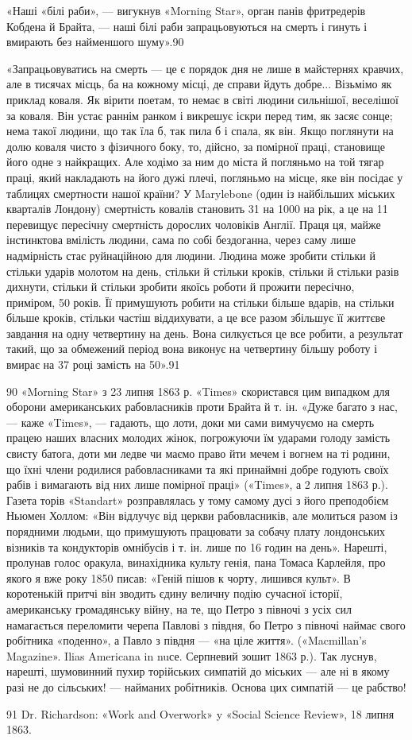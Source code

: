 «Наші «білі раби», — вигукнув «Morning Star», орган панів
фритредерів Кобдена й Брайта, — наші білі раби запрацьовуються
на смерть і гинуть і вмирають без найменшого шуму».90

«Запрацьовуватись на смерть — це є порядок дня не лише
в майстернях кравчих, але в тисячах місць, ба на кожному місці,
де справи йдуть добре... Візьмімо як приклад коваля. Як вірити
поетам, то немає в світі людини сильнішої, веселішої за коваля.
Він устає раннім ранком і викрешує іскри перед тим, як засяє
сонце; нема такої людини, що так їла б, так пила б і спала, як
він. Якщо поглянути на долю коваля чисто з фізичного боку, то,
дійсно, за помірної праці, становище його одне з найкращих.
Але ходімо за ним до міста й погляньмо на той тягар праці, який
накладають на його дужі плечі, погляньмо на місце, яке він посідає
у таблицях смертности нашої країни? У Marylebone (один із
найбільших міських кварталів Лондону) смертність ковалів становить
31 на 1000 на рік, а це на 11 перевищує пересічну смертність
дорослих чоловіків Англії. Праця ця, майже інстинктова вмілість
людини, сама по собі бездоганна, через саму лише надмірність
стає руйнаційною для людини. Людина може зробити стільки й
стільки ударів молотом на день, стільки й стільки кроків, стільки
й стільки разів дихнути, стільки й стільки зробити якоїсь роботи
й прожити пересічно, приміром, 50 років. Її примушують робити
на стільки більше вдарів, на стільки більше кроків, стільки частіш
віддихувати, а це все разом збільшує її життєве завдання на
одну четвертину на день. Вона силкується це все робити, а результат
такий, що за обмежений період вона виконує на четвертину
більшу роботу і вмирає на 37 році замість на 50».91

90 «Morning Star» з 23 липня 1863 р. «Times» скористався цим випадком
для оборони американських рабовласників проти Брайта й т. ін.
«Дуже багато з нас, — каже «Times», — гадають, що лоти, доки ми сами
вимучуємо на смерть працею наших власних молодих жінок, погрожуючи
їм ударами голоду замість свисту батога, доти ми ледве чи маємо право
йти мечем і вогнем на ті родини, що їхні члени родилися рабовласниками
та які принаймні добре годують своїх рабів і вимагають від них лише
помірної праці» («Times», а 2 липня 1863 р.). Газета торів «Standart»
розправлялась у тому самому дусі з його преподобієм Ньюмен Холлом:
«Він відлучує від церкви рабовласників, але молиться разом із порядними
людьми, що примушують працювати за собачу плату лондонських візників
та кондукторів омнібусів і т. ін. лише по 16 годин на день». Нарешті,
пролунав голос оракула, винахідника культу генія, пана Томаса Карлейля,
про якого я вже року 1850 писав: «Геній пішов к чорту, лишився культ».
В коротенькій притчі він зводить єдину величну подію сучасної історії,
американську громадянську війну, на те, що Петро з півночі з усіх сил
намагається переломити черепа Павлові з півдня, бо Петро з півночі
наймає свого робітника «поденно», а Павло з півдня — «на ціле життя».
(«Macmillan’s Magazine». Ilias Americana in nuсе. Серпневий зошит
1863 р.). Так луснув, нарешті, шумовинний пухир торійських симпатій
до міських — але ні в якому разі не до сільських! — найманих робітників.
Основа цих симпатій — це рабство!

91    Dr. Richardson: «Work and Overwork» y «Social Science Review»,
18 липня 1863.
